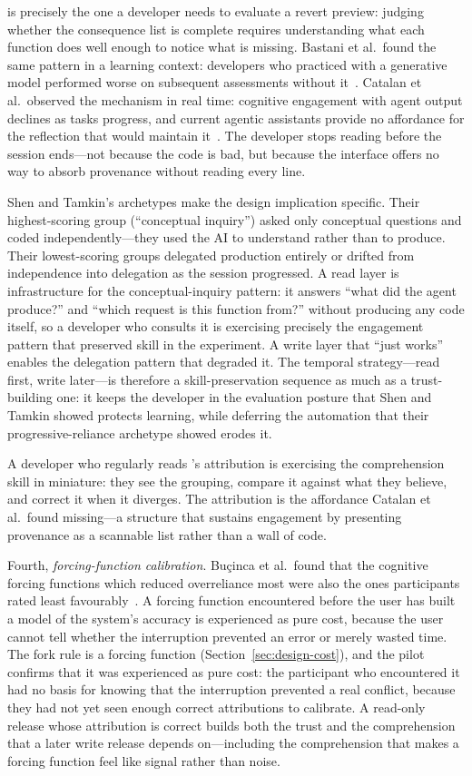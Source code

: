 is precisely the one a developer needs to evaluate a revert preview: judging
whether the consequence list is complete requires understanding what each function
does well enough to notice what is missing. Bastani et al.\ found the same pattern
in a learning context: developers who practiced with a generative model performed
worse on subsequent assessments without it~\cite{bastani2025}. Catalan et al.\
observed the mechanism in real time: cognitive engagement with agent output declines
as tasks progress, and current agentic assistants provide no affordance for the
reflection that would maintain it~\cite{catalan2026notreading}. The developer stops
reading before the session ends---not because the code is bad, but because the
interface offers no way to absorb provenance without reading every line.

Shen and Tamkin's archetypes make the design implication specific. Their
highest-scoring group (``conceptual inquiry'') asked only conceptual questions and
coded independently---they used the AI to understand rather than to produce. Their
lowest-scoring groups delegated production entirely or drifted from independence
into delegation as the session progressed. A read layer is infrastructure for the
conceptual-inquiry pattern: it answers ``what did the agent produce?'' and ``which
request is this function from?'' without producing any code itself, so a developer
who consults it is exercising precisely the engagement pattern that preserved skill
in the experiment. A write layer that ``just works'' enables the delegation pattern
that degraded it. The temporal strategy---read first, write later---is therefore a
skill-preservation sequence as much as a trust-building one: it keeps the
developer in the evaluation posture that Shen and Tamkin showed protects learning,
while deferring the automation that their progressive-reliance archetype showed
erodes it.

A developer who regularly reads \sgt{}'s attribution is exercising the
comprehension skill in miniature: they see the grouping, compare it against what
they believe, and correct it when it diverges. The attribution is the affordance
Catalan et al.\ found missing---a structure that sustains engagement by presenting
provenance as a scannable list rather than a wall of code.

Fourth, \emph{forcing-function calibration}. Bu\c{c}inca et al.\ found that the
cognitive forcing functions which reduced overreliance most were also the ones
participants rated least favourably~\cite{bucinca2021}. A forcing function
encountered before the user has built a model of the system's accuracy is
experienced as pure cost, because the user cannot tell whether the interruption
prevented an error or merely wasted time. The fork rule is a forcing function
(Section~\ref{sec:design-cost}), and the pilot confirms that it was experienced as
pure cost: the participant who encountered it had no basis for knowing that the
interruption prevented a real conflict, because they had not yet seen enough
correct attributions to calibrate. A read-only release whose attribution is
correct builds both the trust and the comprehension that a later write release
depends on---including the comprehension that makes a forcing function feel like
signal rather than noise.

